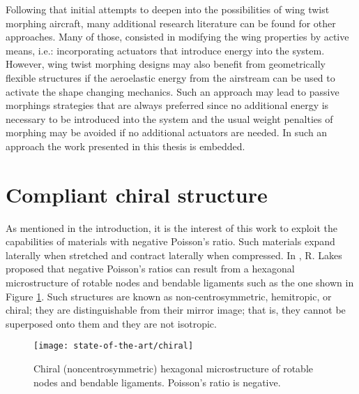   Following that initial attempts to deepen into the possibilities of wing twist morphing aircraft, many additional research literature can be found for other approaches. Many of those, consisted in modifying the wing properties by active means, i.e.: incorporating actuators that introduce energy into the system. However, wing twist morphing designs may also benefit from geometrically flexible structures if the aeroelastic energy from the airstream can be used to activate the shape changing mechanics. Such an approach may lead to passive morphings strategies that are always preferred since no additional energy is necessary to be introduced into the system and the usual weight penalties of morphing may be avoided if no additional actuators are needed. In such an approach the work presented in this thesis is embedded.

\clearpage
\section{Compliant chiral structure} \label{sec:chiral_state}

  As mentioned in the introduction, it is the interest of this work to exploit the capabilities of materials with negative Poisson's ratio. Such materials expand laterally when stretched and contract laterally when compressed. In \cite{Lakes1991}, R. Lakes proposed that negative Poisson's ratios can result from a hexagonal microstructure of rotable nodes and bendable ligaments such as the one shown in Figure \ref{fig:chiral}. Such structures are known as non-centrosymmetric, hemitropic, or chiral; they are distinguishable from their mirror image; that is, they cannot be superposed onto them and they are not isotropic.

  \begin{figure}[!htpb]
    \centering
    \texttt{[image: state-of-the-art/chiral]}
    \caption[Chiral structure of rotable nodes and bendable ligaments]{Chiral (noncentrosymmetric) hexagonal microstructure of rotable nodes and bendable ligaments. Poisson's ratio is negative. \cite{Lakes1991}}\label{fig:chiral}
  \end{figure}

